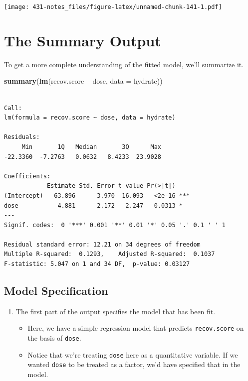 \documentclass[
]{book}
\newenvironment{Shaded}{\begin{snugshade}}{\end{snugshade}}
\newcommand{\DataTypeTok}[1]{\textcolor[rgb]{0.13,0.29,0.53}{#1}}
\newcommand{\KeywordTok}[1]{\textcolor[rgb]{0.13,0.29,0.53}{\textbf{#1}}}
\newcommand{\NormalTok}[1]{#1}
\newcommand{\OperatorTok}[1]{\textcolor[rgb]{0.81,0.36,0.00}{\textbf{#1}}}
\newcommand{\StringTok}[1]{\textcolor[rgb]{0.31,0.60,0.02}{#1}}
\providecommand{\tightlist}{%
  \setlength{\itemsep}{0pt}\setlength{\parskip}{0pt}}
\begin{document}
\texttt{[image: 431-notes\_files/figure-latex/unnamed-chunk-141-1.pdf]}

\hypertarget{the-summary-output}{%
\section{The Summary Output}\label{the-summary-output}}

To get a more complete understanding of the fitted model, we'll summarize it.

\begin{Shaded}
\begin{Highlighting}[]
\KeywordTok{summary}\NormalTok{(}\KeywordTok{lm}\NormalTok{(recov.score }\OperatorTok{~}\StringTok{ }\NormalTok{dose, }\DataTypeTok{data =}\NormalTok{ hydrate))}
\end{Highlighting}
\end{Shaded}

\begin{verbatim}

Call:
lm(formula = recov.score ~ dose, data = hydrate)

Residuals:
     Min       1Q   Median       3Q      Max 
-22.3360  -7.2763   0.0632   8.4233  23.9028 

Coefficients:
            Estimate Std. Error t value Pr(>|t|)    
(Intercept)   63.896      3.970  16.093   <2e-16 ***
dose           4.881      2.172   2.247   0.0313 *  
---
Signif. codes:  0 '***' 0.001 '**' 0.01 '*' 0.05 '.' 0.1 ' ' 1

Residual standard error: 12.21 on 34 degrees of freedom
Multiple R-squared:  0.1293,	Adjusted R-squared:  0.1037 
F-statistic: 5.047 on 1 and 34 DF,  p-value: 0.03127
\end{verbatim}

\hypertarget{model-specification}{%
\subsection{Model Specification}\label{model-specification}}

\begin{enumerate}
\def\labelenumi{\arabic{enumi}.}
\tightlist
\item
  The first part of the output specifies the model that has been fit.

  \begin{itemize}
  \tightlist
  \item
    Here, we have a simple regression model that predicts \texttt{recov.score} on the basis of \texttt{dose}.
  \item
    Notice that we're treating \texttt{dose} here as a quantitative variable. If we wanted \texttt{dose} to be treated as a factor, we'd have specified that in the model.
  \end{itemize}
\end{enumerate}
\end{document}
